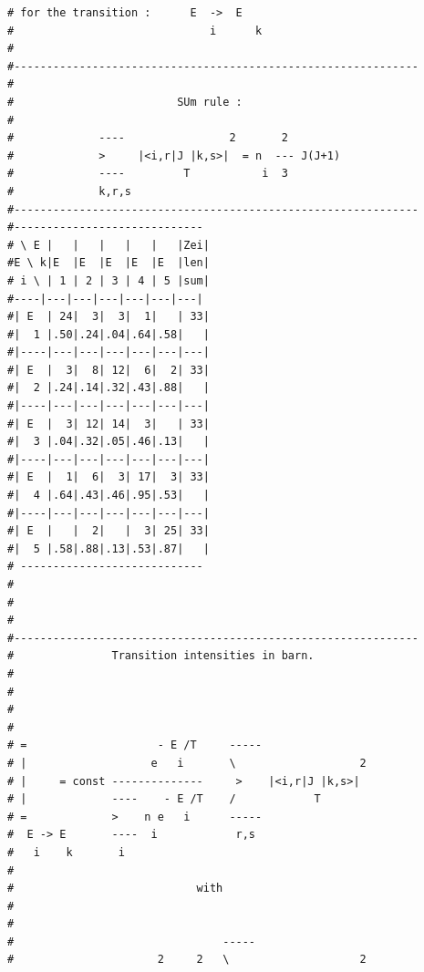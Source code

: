 \begin{enumerate}
{\begin{verbatim}
# for the transition :      E  ->  E                           
#                              i      k                        
#                                                              
#--------------------------------------------------------------
#                                                              
#                         SUm rule :                           
#                                                              
#             ----                2       2                    
#             >     |<i,r|J |k,s>|  = n  --- J(J+1)            
#             ----         T           i  3                    
#             k,r,s                                            
#-------------------------------------------------------------- 
#----------------------------- 
# \ E |   |   |   |   |   |Zei|
#E \ k|E  |E  |E  |E  |E  |len|
# i \ | 1 | 2 | 3 | 4 | 5 |sum|
#----|---|---|---|---|---|---|
#| E  | 24|  3|  3|  1|   | 33|
#|  1 |.50|.24|.04|.64|.58|   |
#|----|---|---|---|---|---|---|
#| E  |  3|  8| 12|  6|  2| 33|
#|  2 |.24|.14|.32|.43|.88|   |
#|----|---|---|---|---|---|---|
#| E  |  3| 12| 14|  3|   | 33|
#|  3 |.04|.32|.05|.46|.13|   |
#|----|---|---|---|---|---|---|
#| E  |  1|  6|  3| 17|  3| 33|
#|  4 |.64|.43|.46|.95|.53|   |
#|----|---|---|---|---|---|---|
#| E  |   |  2|   |  3| 25| 33|
#|  5 |.58|.88|.13|.53|.87|   |
# ---------------------------- 
#
#
#
#-------------------------------------------------------------- 
#               Transition intensities in barn.                
#                                                              
#                                                              
#                                                              
#                                                              
# =                    - E /T     -----                        
# |                   e   i       \                   2        
# |     = const --------------     >    |<i,r|J |k,s>|         
# |             ----    - E /T    /            T               
# =             >    n e   i      -----                        
#  E -> E       ----  i            r,s                         
#   i    k       i                                             
#                                                              
#                            with                              
#                                                              
#                                                              
#                                -----                         
#                      2     2   \                    2        

\end{verbatim}}
\end{enumerate}
